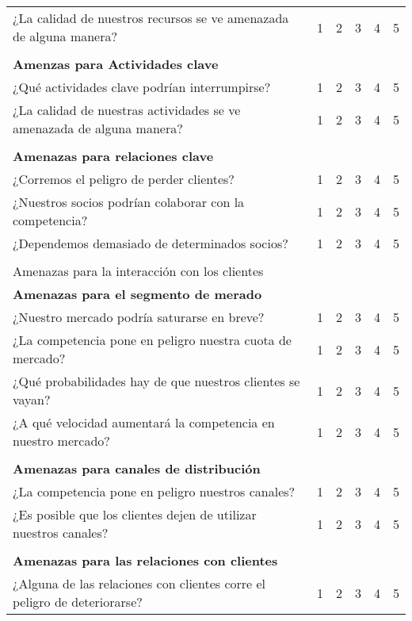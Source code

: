 \documentclass[11pt]{book}
\begin{document}
\begin{table}[htbp]
\begin{tabular}{p{26.145em}ccccc}
    ¿La calidad de nuestros recursos se ve amenazada de alguna manera? & 1     & 2     & 3     & 4     & 5 \\
    \multicolumn{1}{l}{} &       &       &       &       &  \\
    \textbf{Amenzas para Actividades clave} &       &       &       &       &  \\
    ¿Qué actividades clave podrían interrumpirse? & 1     & 2     & 3     & 4     & 5 \\
    ¿La calidad de nuestras actividades se ve amenazada de alguna manera? & 1     & 2     & 3     & 4     & 5 \\
    \multicolumn{1}{l}{} &       &       &       &       &  \\
    \textbf{Amenazas para relaciones clave} &       &       &       &       &  \\
    ¿Corremos el peligro de perder clientes? & 1     & 2     & 3     & 4     & 5 \\
    ¿Nuestros socios podrían colaborar con la competencia? & 1     & 2     & 3     & 4     & 5 \\
    ¿Dependemos demasiado de determinados socios? & 1     & 2     & 3     & 4     & 5 \\
    \multicolumn{1}{l}{} &       &       &       &       &  \\
    \textcolor[rgb]{ 1,  0,  0}{Amenazas para la interacción con los clientes} &       &       &       &       &  \\
    \textbf{Amenazas para el segmento de merado} &       &       &       &       &  \\
    ¿Nuestro mercado podría saturarse en breve? & 1     & 2     & 3     & 4     & 5 \\
    ¿La competencia pone en peligro nuestra cuota de mercado? & 1     & 2     & 3     & 4     & 5 \\
    ¿Qué probabilidades hay de que nuestros clientes se vayan? & 1     & 2     & 3     & 4     & 5 \\
    ¿A qué velocidad aumentará la competencia en nuestro mercado? & 1     & 2     & 3     & 4     & 5 \\
    \multicolumn{1}{l}{} &       &       &       &       &  \\
    \textbf{Amenazas para canales de distribución} &       &       &       &       &  \\
    ¿La competencia pone en peligro nuestros canales? & 1     & 2     & 3     & 4     & 5 \\
    ¿Es posible que los clientes dejen de utilizar nuestros canales? & 1     & 2     & 3     & 4     & 5 \\
    \multicolumn{1}{l}{} &       &       &       &       &  \\
    \textbf{Amenazas para las relaciones con clientes} &       &       &       &       &  \\
    ¿Alguna de las relaciones con clientes corre el peligro de deteriorarse? & 1     & 2     & 3     & 4     & 5 \\
    \end{tabular}%
  \label{tab:addlabel}%
\end{table}%
\end{document}

